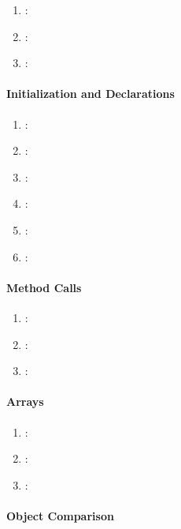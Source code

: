 \begin{enumerate} [resume]
	\item \emph{\checkY}:
	\item \emph{\checkZ}:
	\item \emph{\checkAA}:
\end{enumerate}

\paragraph{Initialization and Declarations} %
\label{par:initialization_and_declarations}

\begin{enumerate} [resume]
	\item \emph{\checkAB}:
	\item \emph{\checkAC}:
	\item \emph{\checkAD}:
	\item \emph{\checkAE}:
	\item \emph{\checkAF}:
	\item \emph{\checkAG}:
\end{enumerate}

\paragraph{Method Calls} %
\label{par:method_calls}

\begin{enumerate} [resume]
	\item \emph{\checkAH}:
	\item \emph{\checkAI}:
	\item \emph{\checkAJ}:
\end{enumerate}

\paragraph{Arrays} %
\label{par:arrays}

\begin{enumerate} [resume]
	\item \emph{\checkAK}:
	\item \emph{\checkAL}:
	\item \emph{\checkAM}:
\end{enumerate}

\paragraph{Object Comparison} %
\label{par:object_comparison}

